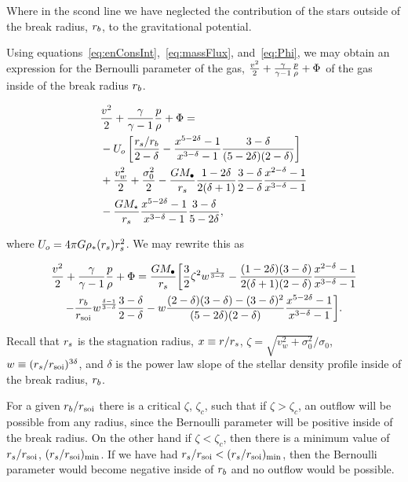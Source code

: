 Where in the scond line we have neglected the contribution of the
stars outside of the break radius, $r_b$, to the gravitational potential.


Using equations~\eqref{eq:enConsInt},~\eqref{eq:massFlux},
and~\eqref{eq:Phi}, we may obtain an expression for the Bernoulli
parameter of the gas, $\frac{v^2}{2}+\frac{\gamma}{\gamma-1} \frac{p}{\rho} +\Phi$ of the gas inside
of the break radius $r_b$.

\begin{align}
  &\frac{v^2}{2}+\frac{\gamma}{\gamma-1} \frac{p}{\rho} +\Phi = \nonumber\\
  &-U_o\left[\frac{r_s/r_b}{2-\delta}-\frac{x^{5-2\delta}-1}{x^{3-\delta}-1}\frac{3-\delta}{(5-2\delta)(2-\delta)}\right]\nonumber\\
  &+\frac{v_w^2}{2}+\frac{\sigma_0^2}{2}- \frac{G M_{\bullet}}{r_s}
  \frac{1-2\delta}{2(\delta+1)} \frac{3-\delta}{2-\delta}\frac{x^{2-\delta}-1}{x^{3-\delta}-1}
  \nonumber\\
  &-\frac{G M_\star}{r_s}
  \frac{x^{5-2\delta}-1}{x^{3-\delta}-1}\frac{3-\delta}{5-2\delta},
\end{align}

where $U_o=4 \pi G \rho_*(r_s) r_s^2$.  We may rewrite this as 

\begin{multline}
  \frac{v^2}{2}+\frac{\gamma}{\gamma-1} \frac{p}{\rho}+\Phi
=\frac{G M_{\bullet}}{r_s} 
\biggl[
  \frac{3}{2} \zeta^2 w^{\frac{1}{3 -\delta}}
  -\frac{(1-2\delta)(3-\delta)}{2(\delta+1)(2-\delta)}  \frac{x^{2  -\delta}-1}{x^{3-\delta}-1}\\
  -\frac{r_b}{r_{\rm soi}} w^{\frac{\delta-1}{3-\delta}} \frac{3 -\delta}{2 -\delta} 
  -w \frac{(2-\delta)(3-\delta)-(3-\delta)^{2}}{(5-2\delta)(2-\delta)} \frac{x^{5-2\delta}-1}{x^{3-\delta}-1}
\biggr].
\label{eq:enthAnal}
\end{multline}

Recall that $r_s$ is the stagnation radius, $x\equiv r/r_s$, $\zeta=\sqrt{v_w^2+\sigma_0^2}/\sigma_0$, $w\equiv (r_s/r_{\rm soi})^{3\delta}$, and
$\delta$ is the power law slope of the stellar density profile inside
of the break radius, $r_b$.

 For a given $r_b/r_{\rm soi}$ there is a critical $\zeta$, $\zeta_{c}$, such
 that if $\zeta>\zeta_c$, an outflow will be possible from any
radius, since the Bernoulli parameter will be positive inside of the
break radius. On the other hand if $\zeta<\zeta_c$, then there is a
minimum value of $r_s/r_{\rm soi}$, $(r_s/r_{\rm soi})_{\rm min}$. If we have had
$r_s/r_{\rm soi}<(r_s/r_{\rm soi})_{\rm min}$, then the Bernoulli parameter would
become negative inside of $r_b$ and no outflow would be possible.

